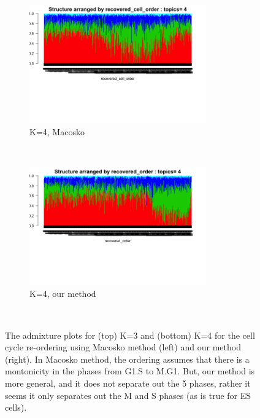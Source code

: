 \documentclass[11pt]{article}
\begin{document}
\begin{figure}[ht]
     \begin{subfigure}[t]{0.5\textwidth}
        \centering
        \includegraphics[height=2in]{../figures/ipsc_structure_batchcorrect_cellcycle/clus_4/struct_clus_4_recovered_cell_order.png}
        \caption{K=4, Macosko}
    \end{subfigure}%
    ~
    \begin{subfigure}[t]{0.5\textwidth}
        \centering
        \includegraphics[height=2in]{../figures/ipsc_structure_batchcorrect_cellcycle/clus_4/struct_clus_4_recovered_order.png}
        \caption{K=4, our method}
    \end{subfigure}\\
  \caption{The admixture plots for (top) K=3 and (bottom) K=4 for the cell cycle re-ordering using Macosko method (left) and our method (right). In Macosko method, the ordering assumes that there is a montonicity in the phases from G1.S to M.G1. But, our method is more general, and it does not separate out the 5 phases, rather it seems it only separates out the M and S phases (as is true for ES cells).}
 \label{fig:fig5}
 \end{figure}   
\end{document}
